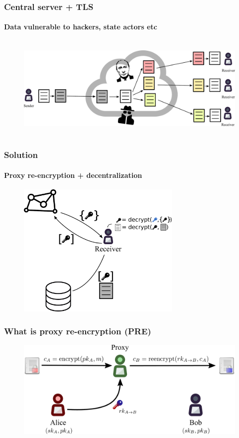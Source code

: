 \documentclass[xetex,mathsans,sans,aspectratio=169]{beamer}
\begin{document}
    \begin{frame}
        \frametitle{Central server + TLS}
        \framesubtitle{Data vulnerable to hackers, state actors etc}
        \begin{figure}
            \centering
            \includegraphics[height=5cm]{pdf/file-sharing-tls.pdf}
        \end{figure}
    \end{frame}

    \begin{frame}
        \frametitle{Solution}
        \framesubtitle{Proxy re-encryption + decentralization}
        \begin{figure}
            \centering
            \includegraphics[height=6.5cm]{pdf/pre-kms.pdf}
        \end{figure}
    \end{frame}

    \begin{frame}
        \frametitle{What is proxy re-encryption (PRE)}
        \begin{figure}
            \centering
            \includegraphics[width=13cm]{pdf/pre.pdf}
        \end{figure}
    \end{frame}
    
\end{document}
